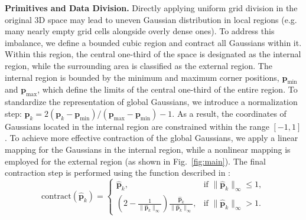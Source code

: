 \noindent\textbf{Primitives and Data Division.}
Directly applying uniform grid division in the original 3D space may lead to uneven Gaussian distribution in local regions (e.g. many nearly empty grid cells alongside overly dense ones). 
To address this imbalance, we define a bounded cubic region and contract all Gaussians within it. Within this region, the central one-third of the space is designated as the internal region, while the surrounding area is classified as the external region. The internal region is bounded by the minimum and maximum corner positions, $\mathbf{p}_{\text{min}}$ and $\mathbf{p}_{\text{max}}$, which define the limits of the central one-third of the entire region.
To standardize the representation of global Gaussians, we introduce a normalization step:
\(
\hat{\mathbf{p}}_k =  2\left( {\mathbf{p}_k - \mathbf{p}_{\text{min}}}\right)/\left({\mathbf{p}_{\text{max}} - \mathbf{p}_{\text{min}}} \right)-1.
\)
As a result, the coordinates of Gaussians located in the internal region are constrained within the range $[-1, 1]$. 
To achieve more effective contraction of the global Gaussians, we apply a linear mapping for the Gaussians in the internal region, while a nonlinear mapping is employed for the external region (as shown in Fig.~\ref{fig:main}). The final contraction step is performed using the function described in \cite{scanerf}:
\small{
    \begin{equation}
        \text{contract} (\hat{\mathbf{p}}_k) =
        \begin{cases}
        \hat{\mathbf{p}}_k, & \text{if } \|\hat{\mathbf{p}}_k\|_\infty \leq 1, \\
        \left( 2 - \frac{1}{\|\hat{\mathbf{p}}_k\|_\infty} \right) \frac{\hat{\mathbf{p}}_k}{\|\hat{\mathbf{p}}_k\|_\infty}, & \text{if } \|\hat{\mathbf{p}}_k\|_\infty > 1.
        \end{cases}
        \label{12}
    \end{equation}
}

